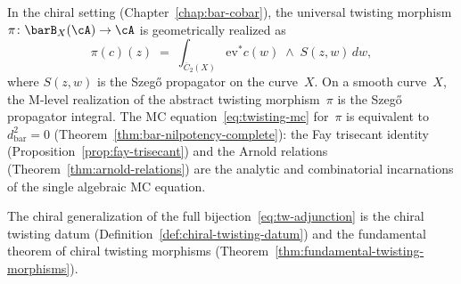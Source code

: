 \begin{remark}
\label{rem:twisting-as-propagator}
In the chiral setting (Chapter~\ref{chap:bar-cobar}), the universal
twisting morphism $\pi\colon \barB_X(\cA) \to \cA$ is geometrically
realized as
\begin{equation}\label{eq:twisting-propagator}
\pi(c)(z)
\;=\;
\int_{\overline{C}_2(X)}
\mathrm{ev}^* c(w) \;\wedge\; S(z, w)\, dw,
\end{equation}
where $S(z,w)$ is the Szeg\H{o} propagator on the curve~$X$.
On a smooth curve~$X$, the M-level realization of the abstract
twisting morphism~$\pi$ is the Szeg\H{o} propagator integral.
The MC equation~\eqref{eq:twisting-mc} for~$\pi$ is equivalent to
$d_{\mathrm{bar}}^2 = 0$
(Theorem~\ref{thm:bar-nilpotency-complete}): the Fay trisecant
identity (Proposition~\ref{prop:fay-trisecant}) and the Arnold
relations (Theorem~\ref{thm:arnold-relations}) are the analytic
and combinatorial incarnations of the single algebraic MC equation.

The chiral generalization of the full bijection~\eqref{eq:tw-adjunction}
is the chiral twisting datum
(Definition~\ref{def:chiral-twisting-datum}) and the fundamental
theorem of chiral twisting morphisms
(Theorem~\ref{thm:fundamental-twisting-morphisms}).
\end{remark}

